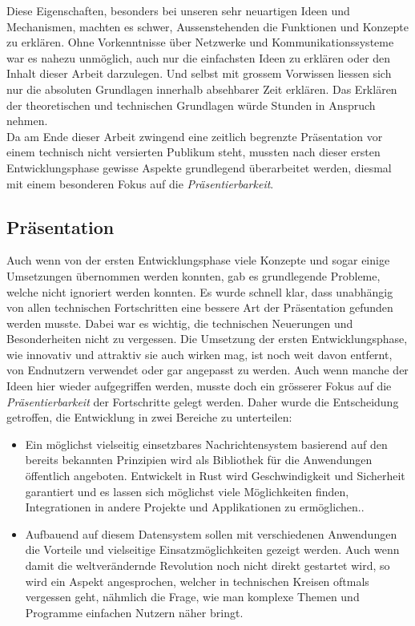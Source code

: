 \documentclass[11pt]{article}
\begin{document}
\noindent Diese Eigenschaften, besonders bei unseren sehr neuartigen
Ideen und Mechanismen, machten es schwer, Aussenstehenden die
Funktionen und Konzepte zu erklären. Ohne Vorkenntnisse über Netzwerke
und Kommunikationssysteme war es nahezu unmöglich, auch nur die
einfachsten Ideen zu erklären oder den Inhalt dieser Arbeit
darzulegen. Und selbst mit grossem Vorwissen liessen sich nur die
absoluten Grundlagen innerhalb absehbarer Zeit erklären. Das Erklären
der theoretischen und technischen Grundlagen würde Stunden in Anspruch
nehmen.\\

\noindent Da am Ende dieser Arbeit zwingend eine zeitlich begrenzte
Präsentation vor einem technisch nicht versierten Publikum steht,
mussten nach dieser ersten Entwicklungsphase gewisse Aspekte
grundlegend überarbeitet werden, diesmal mit einem besonderen Fokus
auf die \emph{Präsentierbarkeit}.
\subsection{Präsentation}
\label{sec:org2958e27}
Auch wenn von der ersten Entwicklungsphase viele Konzepte und sogar
einige Umsetzungen übernommen werden konnten, gab es grundlegende
Probleme, welche nicht ignoriert werden konnten. Es wurde schnell
klar, dass unabhängig von allen technischen Fortschritten eine bessere
Art der Präsentation gefunden werden musste. Dabei war es wichtig, die
technischen Neuerungen und Besonderheiten nicht zu vergessen. Die
Umsetzung der ersten Entwicklungsphase, wie innovativ und attraktiv
sie auch wirken mag, ist noch weit davon entfernt, von Endnutzern
verwendet oder gar angepasst zu werden. Auch wenn manche der Ideen
hier wieder aufgegriffen werden, musste doch ein grösserer Fokus auf
die \emph{Präsentierbarkeit} der Fortschritte gelegt werden. Daher wurde die
Entscheidung getroffen, die Entwicklung in zwei Bereiche zu
unterteilen:
\begin{itemize}
\item Ein möglichst vielseitig einsetzbares Nachrichtensystem basierend
auf den bereits bekannten Prinzipien wird als Bibliothek für die
Anwendungen öffentlich angeboten. Entwickelt in Rust wird
Geschwindigkeit und Sicherheit garantiert und es lassen sich
möglichst viele Möglichkeiten finden, Integrationen in andere
Projekte und Applikationen zu ermöglichen..
\item Aufbauend auf diesem Datensystem sollen mit verschiedenen
Anwendungen die Vorteile und vielseitige Einsatzmöglichkeiten
gezeigt werden. Auch wenn damit die weltverändernde Revolution noch
nicht direkt gestartet wird, so wird ein Aspekt angesprochen,
welcher in technischen Kreisen oftmals vergessen geht, nähmlich die
Frage, wie man komplexe Themen und Programme einfachen Nutzern näher
bringt.
\end{itemize}
\end{document}
